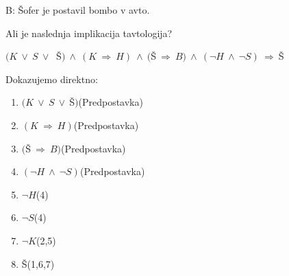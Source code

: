 \documentclass[11pt,paper=b5,footinclude,headinclude]{scrbook} %
\def\ali {{~\vee~}}
\def\inn {{~\wedge~}}
\def\sledi {{~\Rightarrow~}}
\newtheorem{ex}{Vaja\hypertarget{sol:\theex}}[chapter]
\begin{document}
\begin{ex}
\begin{ex}
\begin{sol}
B: Šofer je postavil bombo v avto.

\medskip
Ali je naslednja implikacija tavtologija?

$(K\ali S\ali$ \v S$)\inn(K\sledi H)\inn($Š$\sledi B)\inn(\neg H\inn \neg S)\sledi $Š

Dokazujemo direktno:
\bigskip
\begin{enumerate}
    \item $(K\ali S\ali $Š$)$\hfill (Predpostavka)
    \item $(K\sledi H)$\hfill (Predpostavka)
    \item $($Š$\sledi B)$\hfill (Predpostavka)
    \item $(\neg H\inn \neg S)$\hfill (Predpostavka)
    \item $\neg H$\hfill (4)
    \item $\neg S$\hfill (4)
    \item $\neg K$\hfill (2,5)
    \item Š\hfill (1,6,7)
\end{enumerate}

\end{sol}
\end{ex}

















\end{ex}
\end{document}
